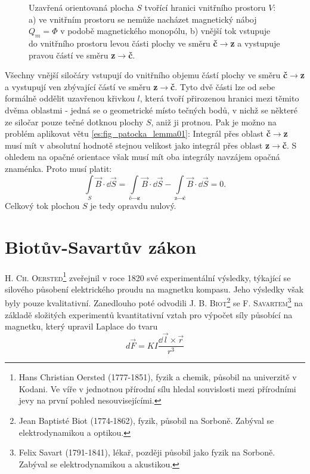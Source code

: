     \begin{figure}[ht!]
      \centering  
      \caption{Uzavřená orientovaná plocha \(S\) tvořící hranici vnitřního prostoru \(V\): a) ve
               vnitřním prostoru se nemůže nacházet magnetický náboj \(Q_m = \Phi\) v podobě
               magnetického monopólu, b) vnější tok vstupuje do vnitřního prostoru levou části
               plochy ve směru \textbf{č\(\rightarrow\)z} a vystupuje pravou částí ve směru 
               \textbf{z\(\rightarrow\)č}.} 
      \label{teo:fig061}
    \end{figure}

    Všechny vnější siločáry vstupují do vnitřního objemu částí plochy ve směru
    \textbf{č}\(\rightarrow\)\textbf{z} a vystupují ven zbývající částí ve směru
    \textbf{z}\(\rightarrow\)\textbf{č}. Tyto dvě části lze od sebe formálně oddělit uzavřenou
    křivkou \(l\), která tvoří přirozenou hranici mezi těmito dvěma oblastmi - jedná se o
    geometrické místo tečných bodů, v nichž se některé ze siločar pouze tečné dotknou plochy \(S\),
    aniž ji protnou. Pak je možno na problém aplikovat větu \ref{es:fig_patocka_lemma01}: Integrál
    přes oblast \textbf{č}\(\rightarrow\)\textbf{z} musí mít v absolutní hodnotě stejnou velikost
    jako integrál přes oblast \textbf{z}\(\rightarrow\)\textbf{č}. S ohledem na opačné orientace
    však musí mít oba integrály navzájem opačná znaménka. Proto musí platit:
    \begin{equation*}
      \int\limits_{S}\vec{B}\cdot \dd{\vec{S}} = 
      \int\limits_{\text{č}\rightarrow\text{z}}\vec{B}\cdot \dd{\vec{S}} -
      \int\limits_{\text{z}\rightarrow\text{č}}\vec{B}\cdot \dd{\vec{S}} = 0.
    \end{equation*} 
    Celkový tok plochou \(S\) je tedy opravdu nulový.
    
  \section{Biotův-Savartův zákon}\label{ES:sec10}
    \textsc{H. Ch. Oersted}\footnote{Hans Christian Oersted (1777-1851), fyzik a chemik, působil na
    univerzitě v Kodani. Ve víře v jednotnou přírodní sílu hledal souvislosti mezi přírodními jevy
    na první pohled nesouvisejícími.} zveřejnil v roce 1820 své experimentální výsledky, týkající se
    silového působení elektrického proudu na magnetku kompasu. Jeho výsledky však byly pouze
    kvalitativní. Zanedlouho poté odvodili \textsc{J. B. Biot}\footnote{Jean Baptisté Biot
    (1774-1862), fyzik, působil na Sorboně. Zabýval se elektrodynamikou a optikou.} se \textsc{F.
    Savartem}\footnote{Felix Savart (1791-1841), lékař, později působil jako fyzik na Sorboně.
    Zabýval se elektrodynamikou a akustikou.} na základě složitých experimentů kvantitativní vztah
    pro výpočet síly působící na magnetku, který upravil Laplace do tvaru
    \begin{equation}\label{TEO:eq133}
      d\vec{F} = KI\frac{\dd{\vec{l}}\times \vec{r}}{r^3}
    \end{equation} 
    
